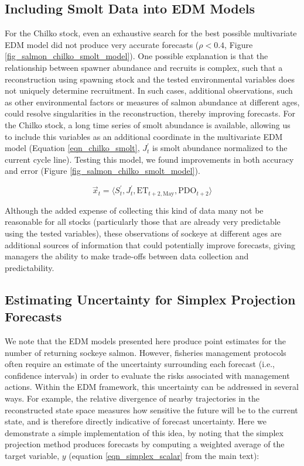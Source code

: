 \subsection{Including Smolt Data into EDM Models}

For the Chilko stock, even an exhaustive search for the best possible multivariate EDM model did not produce very accurate forecasts ($\rho < 0.4$, Figure \ref{fig_salmon_chilko_smolt_model}). One possible explanation is that the relationship between spawner abundance and recruits is complex, such that a reconstruction using spawning stock and the tested environmental variables does not uniquely determine recruitment. In such cases, additional observations, such as other environmental factors or measures of salmon abundance at different ages, could resolve singularities in the reconstruction, thereby improving forecasts. For the Chilko stock, a long time series of smolt abundance is available, allowing us to include this variables as an additional coordinate in the multivariate EDM model (Equation \ref{eqn_chilko_smolt}, $J_t^\prime$ is smolt abundance normalized to the current cycle line). Testing this model, we found improvements in both accuracy and error (Figure \ref{fig_salmon_chilko_smolt_model}).

\begin{equation}
\label{eqn_chilko_smolt}
\vec{x}_t = \langle S_t^\prime, J_t^\prime, \mathrm{ET}_{t+2, \mathrm{May}}, \mathrm{PDO}_{t+2}\rangle
\end{equation}

Although the added expense of collecting this kind of data many not be reasonable for all stocks (particularly those that are already very predictable using the tested variables), these observations of sockeye at different ages are additional sources of information that could potentially improve forecasts, giving managers the ability to make trade-offs between data collection and predictability.

\subsection{Estimating Uncertainty for Simplex Projection Forecasts}

We note that the EDM models presented here produce point estimates for the number of returning sockeye salmon. However, fisheries management protocols often require an estimate of the uncertainty surrounding each forecast (i.e., confidence intervals) in order to evaluate the risks associated with management actions. Within the EDM framework, this uncertainty can be addressed in several ways. For example, the relative divergence of nearby trajectories in the reconstructed state space measures how sensitive the future will be to the current state, and is therefore directly indicative of forecast uncertainty. Here we demonstrate a simple implementation of this idea, by noting that the simplex projection method produces forecasts by computing a weighted average of the target variable, $y$ (equation \ref{eqn_simplex_scalar} from the main text):

